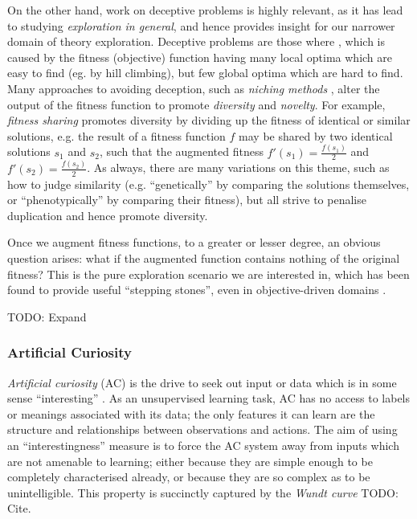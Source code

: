 \documentclass[]{article}
\begin{document}
On the other hand, work on deceptive problems is highly relevant, as it has lead to studying \emph{exploration in general}, and hence provides insight for our narrower domain of theory exploration. Deceptive problems are those where  \cite{lehman2011abandoning}, which is caused by the fitness (objective) function having many local optima which are easy to find (eg. by hill climbing), but few global optima which are hard to find. Many approaches to avoiding deception, such as \emph{niching methods} \cite{sareni1998fitness}, alter the output of the fitness function to promote \emph{diversity} and \emph{novelty}. For example, \emph{fitness sharing} promotes diversity by dividing up the fitness of identical or similar solutions, e.g. the result of a fitness function $f$ may be shared by two identical solutions $s_1$ and $s_2$, such that the augmented fitness $f'(s_1) = \frac{f(s_1)}{2}$ and $f'(s_2) = \frac{f(s_2)}{2}$. As always, there are many variations on this theme, such as how to judge similarity (e.g. ``genetically'' by comparing the solutions themselves, or ``phenotypically'' by comparing their fitness), but all strive to penalise duplication and hence promote diversity.

Once we augment fitness functions, to a greater or lesser degree, an obvious question arises: what if the augmented function contains nothing of the original fitness? This is the pure exploration scenario we are interested in, which has been found to provide useful ``stepping stones'', even in objective-driven domains \cite{lehman2011abandoning}.

TODO: Expand

\subsubsection{Artificial Curiosity}

\emph{Artificial curiosity} (AC) is the drive to seek out input or data which is in some sense ``interesting'' \cite{schmidhuber2006developmental}. As an unsupervised learning task, AC has no access to labels or meanings associated with its data; the only features it can learn are the structure and relationships between observations and actions. The aim of using an ``interestingness'' measure is to force the AC system away from inputs which are not amenable to learning; either because they are simple enough to be completely characterised already, or because they are so complex as to be unintelligible. This property is succinctly captured by the \emph{Wundt curve} TODO: Cite.
\end{document}
